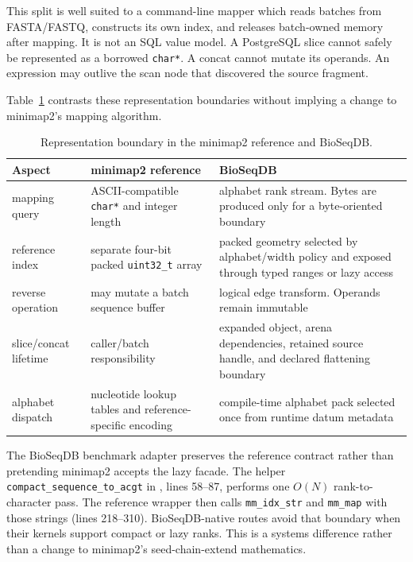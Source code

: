This split is well suited to a command-line mapper which reads batches from
FASTA/FASTQ, constructs its own index, and releases batch-owned memory after
mapping.  It is not an SQL value model.  A PostgreSQL slice cannot safely be
represented as a borrowed \texttt{char*}.  A concat cannot mutate its operands.
An expression may outlive the scan node that discovered the source fragment.

Table~\ref{tab:minimap2-sequence-representation} contrasts these representation
boundaries without implying a change to minimap2's mapping algorithm.

\begin{table}[ht]
\centering
\caption{Representation boundary in the minimap2 reference and
\mbox{BioSeqDB}.}
\label{tab:minimap2-sequence-representation}
\begingroup
\setlength{\tabcolsep}{5pt}
\renewcommand{\arraystretch}{1.08}
\begin{tabularx}{\textwidth}{@{}
  >{\raggedright\arraybackslash}p{}
  >{\raggedright\arraybackslash}p{}
  >{\raggedright\arraybackslash}X@{}}
\textbf{Aspect} & \textbf{minimap2 reference} & \textbf{\mbox{BioSeqDB}}\\
\hline
mapping query & ASCII-compatible \texttt{char*} and integer length &
alphabet rank stream.  Bytes are produced only for a byte-oriented boundary\\
reference index & separate four-bit packed \texttt{uint32\_t} array &
packed geometry selected by alphabet/width policy and exposed through typed
ranges or lazy access\\
reverse operation & may mutate a batch sequence buffer &
logical edge transform.  Operands remain immutable\\
slice/concat lifetime & caller/batch responsibility &
expanded object, arena dependencies, retained source handle, and declared
flattening boundary\\
alphabet dispatch & nucleotide lookup tables and reference-specific encoding &
compile-time alphabet pack selected once from runtime datum metadata\\
\end{tabularx}
\endgroup
\end{table}

The \mbox{BioSeqDB} benchmark adapter preserves the reference contract rather than
pretending minimap2 accepts the lazy facade.  The helper
\texttt{compact\_sequence\_to\_acgt} in
, lines 58--87, performs
one \(O(N)\) rank-to-character pass.  The reference wrapper then calls
\texttt{mm\_idx\_str} and \texttt{mm\_map} with those strings (lines
218--310).  \mbox{BioSeqDB}-native routes avoid that boundary when their kernels
support compact or lazy ranks.  This is a systems difference rather than a
change to minimap2's seed-chain-extend mathematics.

